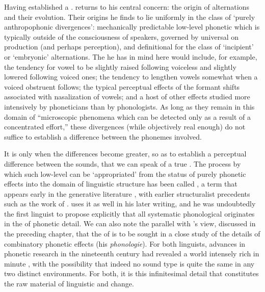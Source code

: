 Having established a . {\Baudouin} returns to his central
concern: the origin of alternations and their evolution. Their origins
he finds to lie uniformly in the class of `purely anthropophonic
divergences': mechanically predictable low-level phonetic 
which is typically outside of the consciousness of speakers, governed
by universal  on production (and perhaps perception), and
definitional for the class of `incipient' or `embryonic'
alternations. The  he has in mind here would include, for
example, the tendency for vowel  to be slightly raised following
voiceless  and slightly lowered following voiced ones; the
tendency to lengthen vowels somewhat when a voiced obstruent follows;
the typical perceptual effects of the formant shifts associated with
nasalization of vowels; and a host of other effects studied more
intensively by phoneticians than by phonologists. As long as they
remain in this domain of ``microscopic phenomena which can be detected
only as a result of a concentrated effort,'' these divergences (while
objectively real enough) do not suffice to establish a difference
between the phonemes involved.

It is only when the differences become greater, so as to establish a
perceptual difference between the sounds, that we can speak of a true
. The process by which such low-level  can be
`appropriated' from the status of purely phonetic effects into the
domain of linguistic structure has been called , a term
that appears early in the generative literature
\citep{hyman76:phonologization}, with earlier structuralist precedents
such as the work of {\Jakobson}. {\Baudouin} uses it as well in his later
writing, and he was undoubtedly the first linguist to propose
explicitly that all systematic phonological  originates in
the  of phonetic detail. We can also note the parallel
with {\Saussure}'s view, discussed in the preceding chapter, that the
 of  is to be sought in a close study of the
details of combinatory phonetic effects (his \emph{phonologie}). For both
linguists, advances in phonetic research in the nineteenth century had
revealed a world intensely rich in minute , with the
possibility that indeed no sound type is quite the same in any two
distinct environments. For both, it is this infinitesimal detail that
constitutes the raw material of linguistic  and change.

